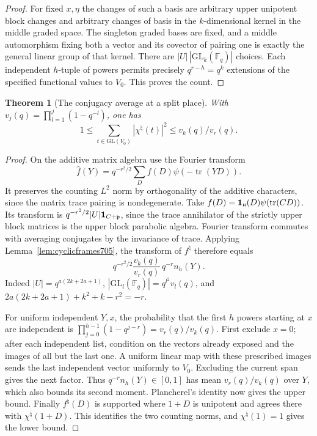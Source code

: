 \documentclass[a4paper,11pt]{article}
\newtheorem{theorem}[proposition]{Theorem}
\theoremstyle{definition}
\theoremstyle{remark}
\numberwithin{equation}{section}
\begin{document}
\begin{proof}
For fixed \(x,\eta\) the changes of such a basis are arbitrary
upper unipotent block changes and arbitrary changes of basis
in the \(k\)-dimensional kernel in the middle graded space.
The singleton graded bases are fixed, and a middle
automorphism fixing both a vector and its covector of pairing
one is exactly the general linear group of that kernel.
There are \(|U|\,|\mathrm{GL}_k(\mathbb F_q)|\) choices.
Each independent \(h\)-tuple of powers permits precisely
\(q^{r-h}=q^k\) extensions of the specified functional
values to \(V_0\). This proves the count.
\end{proof}

\begin{theorem}[The conjugacy average at a split place]\leavevmode
\label{thm:conjugacyfourier705}
With \(v_j(q)=\prod_{l=1}^j(1-q^{-l})\), one has
\[
  1\le \sum_{t\in\mathrm{GL}(V_0)}|\chi^\natural(t)|^2
              \le v_k(q)/v_r(q).
\]
\end{theorem}
\begin{proof}
On the additive matrix algebra use the Fourier transform
\[
 \widehat f(Y)=q^{-r^2/2}\sum_D f(D)\psi(-\operatorname{tr}(YD)).
\]
It preserves the counting \(L^2\) norm by orthogonality
of the additive characters, since the matrix trace pairing
is nondegenerate. Take \(f(D)={\bf1}_{\mathfrak u}(D)
\psi(\operatorname{tr}(CD))\). Its transform is
\(q^{-r^2/2}|U|{\bf1}_{C+\mathfrak p}\), since the trace
annihilator of the strictly upper block matrices is the upper
block parabolic algebra. Fourier transform commutes with
averaging conjugates by the invariance of trace. Applying
Lemma~\ref{lem:cyclicframes705}, the transform of \(f^\natural\)
therefore equals
\[
          q^{-r^2/2}\frac{v_k(q)}{v_r(q)}\,q^{-r}n_h(Y).
\]
Indeed \(|U|=q^{a(2k+2a+1)}\),
\(|\mathrm{GL}_l(\mathbb F_q)|=q^{l^2}v_l(q)\), and
\(2a(2k+2a+1)+k^2+k-r^2=-r\).

For uniform independent \(Y,x\), the probability that the
first \(h\) powers starting at \(x\) are independent is
\(\prod_{j=0}^{h-1}(1-q^{j-r})=v_r(q)/v_k(q)\). First
exclude \(x=0\); after each independent list, condition
on the vectors already exposed and the images of all but
the last one. A uniform linear map with these prescribed
images sends the last independent vector uniformly to
\(V_0\). Excluding the current span gives the next factor.
Thus \(q^{-r}n_h(Y)\in[0,1]\) has mean \(v_r(q)/v_k(q)\)
over \(Y\), which also bounds its second moment. Plancherel's
identity now gives the upper bound. Finally \(f^\natural(D)\)
is supported where \(1+D\) is unipotent and agrees there
with \(\chi^\natural(1+D)\). This identifies the two counting
norms, and \(\chi^\natural(1)=1\) gives the lower bound.
\end{proof}
\end{document}
